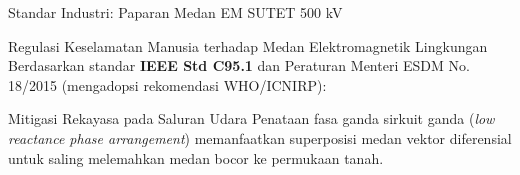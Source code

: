 \documentclass[aspectratio=169,10pt]{beamer}
\begin{document}
\begin{frame}{Standar Industri: Paparan Medan EM SUTET 500 kV}
  \begin{block}{Regulasi Keselamatan Manusia terhadap Medan Elektromagnetik Lingkungan}
    Berdasarkan standar \textbf{IEEE Std C95.1} dan Peraturan Menteri ESDM No. 18/2015 (mengadopsi rekomendasi WHO/ICNIRP):
  \end{block}
  \vspace{0.05cm}
  \begin{table}[h]
    \centering
  \end{table}
  \vspace{-0.1cm}
  \begin{exampleblock}{Mitigasi Rekayasa pada Saluran Udara}
    Penataan fasa ganda sirkuit ganda (\textit{low reactance phase arrangement}) memanfaatkan superposisi medan vektor diferensial untuk saling melemahkan medan bocor ke permukaan tanah.
  \end{exampleblock}
\end{frame}
\end{document}
